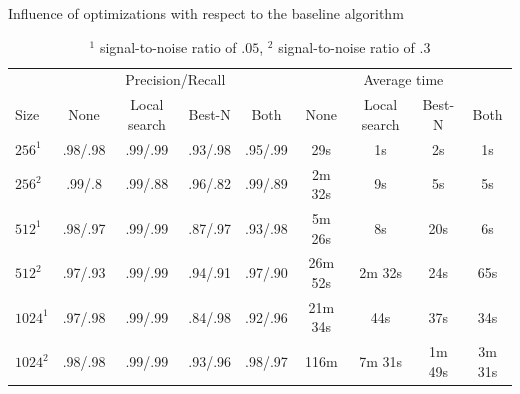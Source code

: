 \documentclass{llncs}
\begin{document}
\begin{table}[p]
\centering
\caption{Influence of optimizations with respect to the baseline algorithm}
\label{table:optimize}
\begin{tabular}{lcccccccc}
\toprule
 & \multicolumn{4}{c}{Precision/Recall} & \multicolumn{4}{c}{Average time}\\
 \cmidrule(r){2-5} \cmidrule(r){6-9} 
 Size & None & Local search & Best-N & Both & None & Local search & Best-N & Both \\
\midrule
 $256^1$   & .98/.98 & .99/.99 & .93/.98 & .95/.99 & 29s & 1s & 2s & 1s \\
 $256^2$   & .99/.8 & .99/.88 & .96/.82 & .99/.89 & 2m 32s & 9s & 5s & 5s \\
 $512^1$   & .98/.97 & .99/.99 & .87/.97 & .93/.98 & 5m 26s & 8s & 20s & 6s \\
 $512^2$   & .97/.93 & .99/.99 & .94/.91 & .97/.90 & 26m 52s & 2m 32s & 24s & 65s \\
 $1024^1$ & .97/.98 & .99/.99 & .84/.98 & .92/.96 & 21m 34s & 44s & 37s & 34s \\
 $1024^2$ & .98/.98 & .99/.99 & .93/.96 & .98/.97 & 116m & 7m 31s & 1m 49s & 3m 31s \\
\bottomrule
\end{tabular}
\caption*{$^1$ signal-to-noise ratio of $.05$, $^2$ signal-to-noise ratio of $.3$}
\end{table}
\end{document}
